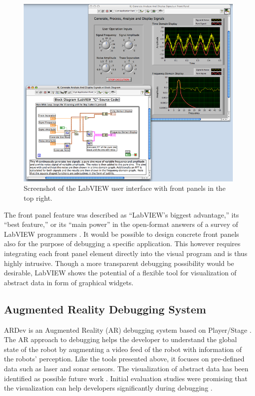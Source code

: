 \begin{figure}[htbp]
  \centering
  \includegraphics[scale=0.45]{img/labview_frontpanel.png}
  \caption{Screenshot of the LabVIEW user interface with front panels in the top right.}
  \label{labview_screenshot}
\end{figure}

The front panel feature was described as ``LabVIEW's biggest advantage,'' its ``best feature,'' or its ``main power'' in the open-format answers of a survey of LabVIEW programmers \cite{Whitley2001}. It would be possible to design concrete front panels also for the purpose of debugging a specific application. This however requires integrating each front panel element directly into the visual program and is thus highly intrusive. Though a more transparent debugging possibility would be desirable, LabVIEW shows the potential of a flexible tool for visualization of abstract data in form of graphical widgets.

\subsection{Augmented Reality Debugging System}
ARDev is an Augmented Reality (AR) debugging system based on Player/Stage \cite{Collett2010}. The AR approach to debugging helps the developer to understand the global state of the robot by augmenting a video feed of the robot with information of the robots' perception. Like the tools presented above, it focuses on pre-defined data such as laser and sonar sensors. The visualization of abstract data has been identified as possible future work \cite{Collett2010}. Initial evaluation studies were promising that the visualization can help developers significantly during debugging \cite{Collett2010}.

